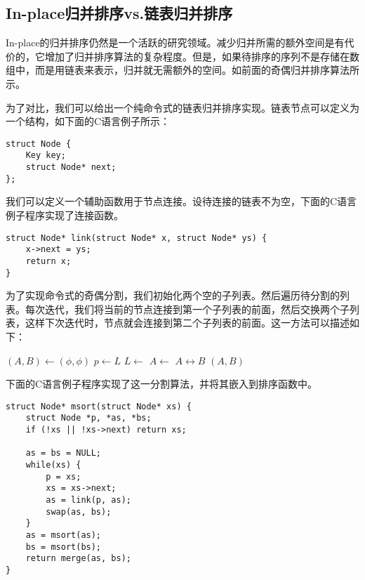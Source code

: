 \documentclass[UTF8]{article}
\begin{document}
\subsection{In-place归并排序vs.链表归并排序}

In-place的归并排序仍然是一个活跃的研究领域。减少归并所需的额外空间是有代价的，它增加了归并排序算法的复杂程度。但是，如果待排序的序列不是存储在数组中，而是用链表来表示，归并就无需额外的空间。如前面的奇偶归并排序算法所示。

为了对比，我们可以给出一个纯命令式的链表归并排序实现。链表节点可以定义为一个结构，如下面的C语言例子所示：

\lstset{language=C}
\begin{lstlisting}
struct Node {
    Key key;
    struct Node* next;
};
\end{lstlisting}

我们可以定义一个辅助函数用于节点连接。设待连接的链表不为空，下面的C语言例子程序实现了连接函数。

\lstset{language=C}
\begin{lstlisting}
struct Node* link(struct Node* x, struct Node* ys) {
    x->next = ys;
    return x;
}
\end{lstlisting}

为了实现命令式的奇偶分割，我们初始化两个空的子列表。然后遍历待分割的列表。每次迭代，我们将当前的节点连接到第一个子列表的前面，然后交换两个子列表，这样下次迭代时，节点就会连接到第二个子列表的前面。这一方法可以描述如下：

\begin{algorithmic}[1]
  \State $(A, B) \gets (\phi, \phi)$
    \State $p \gets L$
    \State $L \gets $ 
    \State $A \gets $ 
    \State {} $A \leftrightarrow B$
  \EndWhile
  \State \Return $(A, B)$
\EndFunction
\end{algorithmic}

下面的C语言例子程序实现了这一分割算法，并将其嵌入到排序函数中。

\lstset{language=C}
\begin{lstlisting}
struct Node* msort(struct Node* xs) {
    struct Node *p, *as, *bs;
    if (!xs || !xs->next) return xs;

    as = bs = NULL;
    while(xs) {
        p = xs;
        xs = xs->next;
        as = link(p, as);
        swap(as, bs);
    }
    as = msort(as);
    bs = msort(bs);
    return merge(as, bs);
}
\end{lstlisting}
\end{document}
